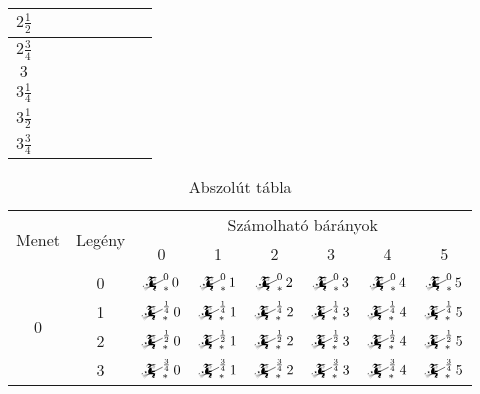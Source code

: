 \documentclass{article}
\newcommand{\blk}{\cellcolor{darkgray}}
\newcommand{\red}{\cellcolor{red!33}}
\newcommand{\grn}{\cellcolor{green!33}}
\newcommand{\just}[1]{\boxed{#1}}%
\newcommand{\incl}{\mathbf{incl}}
\newcommand{\excl}{\mathbf{excl}}
\newcommand{\mainfun}[3]{\mathwitch_{#1}^{#2}#3}
\begin{document}
\begin{table}[H]
\begin{tabular}{c||c|c|c|c|c|c|c|}
		$2\frac12$	&	\blk		&	\blk		&	\red\just\excl	&	\grn\just\incl	&	\blk		&	\blk		\\\hline
		$2\frac34$	&	\blk		&	\blk		&	\red\just\excl	&	\grn\just\incl	&	\blk		&	\blk		\\\hline
			$3$	&	\blk		&	\blk		&	\blk		&	\blk		&	\blk		&	\blk		\\\hline
		$3\frac14$	&	\blk		&	\blk		&	\blk		&	\blk		&	\blk		&	\blk		\\\hline
		$3\frac12$	&	\blk		&	\blk		&	\blk		&	\blk		&	\blk		&	\blk		\\\hline
		$3\frac34$	&	\blk		&	\blk		&	\blk		&	\blk		&	\blk		&	\blk		\\\hline
		\end{tabular}
	\end{table}

	\begin{table}[H]
		\caption*{Abszolút tábla}
		\centering
		\begin{tabular}{c|c|c|c|c|c|c|c|}
			\multirow{2}{*}{Menet} &  \multirow{2}{*}{Legény}  &    \multicolumn{6}{c|}{Számolható bárányok}                           \\
			                       &                           &    0                         &    1                         &    2                         &    3                         &    4                &    5      \\\hline\hline
			\multirow{4}{*}{0}     &  0                        &    $\mainfun{*}00$           &    $\mainfun{*}01$           &    $\mainfun{*}02$           &    $\mainfun{*}03$           &    $\mainfun{*}04$          &    $\mainfun{*}05$          \\\cline{2-8}
			                       &  1                        &    $\mainfun{*}{\frac14}0$   &    $\mainfun{*}{\frac14}1$   &    $\mainfun{*}{\frac14}2$   &    $\mainfun{*}{\frac14}3$   &    $\mainfun{*}{\frac14}4$  &    $\mainfun{*}{\frac14}5$  \\\cline{2-8}
			                       &  2                        &    $\mainfun{*}{\frac12}0$   &    $\mainfun{*}{\frac12}1$   &    $\mainfun{*}{\frac12}2$   &    $\mainfun{*}{\frac12}3$   &    $\mainfun{*}{\frac12}4$  &    $\mainfun{*}{\frac12}5$  \\\cline{2-8}
			                       &  3                        &    $\mainfun{*}{\frac34}0$   &    $\mainfun{*}{\frac34}1$   &    $\mainfun{*}{\frac34}2$   &    $\mainfun{*}{\frac34}3$   &    $\mainfun{*}{\frac34}4$  &    $\mainfun{*}{\frac34}5$  \\\hline\hline

\end{tabular}
\end{table}
\end{document}
